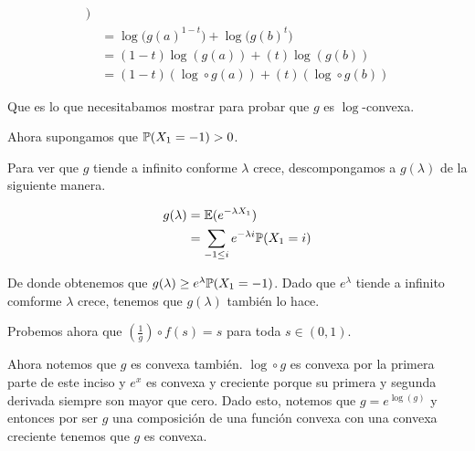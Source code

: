 \begin{align}
                                                \bigg)                                                                              \\
                                         &=      \log\bigg( 
                                                        g(a)^{1-t} 
                                                \bigg)
                                                        + 
                                                \log\bigg(
                                                        g(b)^{t}
                                                \bigg)                                                                              \\
                                         &=      (1-t)\log(g(a))+(t)\log(g(b))                                                      \\
                                         &=      (1-t)(\log \circ g (a))+(t)(\log \circ g (b))                                        
    \end{align}
    
    Que es lo que necesitabamos mostrar para probar que $g$ es $\log$-convexa.\par\null
    
    Ahora supongamos que $\mathbb{P}(X_1 = -1) > 0$.\par\null
    
    Para ver que $g$ tiende a infinito conforme $\lambda$ crece, descompongamos a $g(\lambda)$ de la siguiente manera.
    
    \begin{align}
        g(\lambda)      &=      \mathbb{E}(e^{-\lambda X_1})                \\
                        &=      \sum_{-1 \leq i} e^{-\lambda i} \mathbb{P}( X_1 = i)
    \end{align}\par\null
    
    De donde obtenemos que $g(\lambda) \geq e^{\lambda} \mathbb{P}( X_1 = -1)$. Dado que $e^{\lambda}$ tiende a infinito comforme
    $\lambda$ crece, tenemos que $g(\lambda)$ también lo hace.\par\null
    
    Probemos ahora que $(\frac{1}{g}) \circ f (s) = s$ para toda $s \in (0,1)$.\par\null
    
    Ahora notemos que $g$ es convexa también. $\log \circ g$ es convexa por la primera parte de este inciso y 
    $e^x$ es convexa y creciente porque su primera y segunda derivada siempre son mayor que cero. 
    Dado esto, notemos que $g = e^{\log(g)}$ y entonces por ser $g$ una composición de una función convexa con una
    convexa creciente tenemos que $g$ es convexa.\par\null
    
